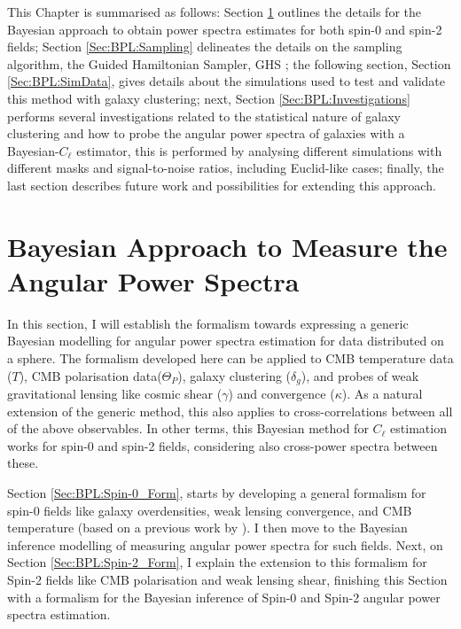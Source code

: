 \qquad This Chapter is summarised as follows: Section \ref{Sec:BPL:Modeling} outlines the details for the Bayesian approach to obtain power spectra estimates for both spin-0 and spin-2 fields; Section \ref{Sec:BPL:Sampling} delineates the details on the sampling algorithm, the Guided Hamiltonian Sampler, GHS \citep{SreeThesis,2013-GuidedHamiltonian}; the following section, Section \ref{Sec:BPL:SimData}, gives details about the simulations used to test and validate this method with galaxy clustering; next, Section \ref{Sec:BPL:Investigations} performs several investigations related to the statistical nature of galaxy clustering and how to probe the angular power spectra of galaxies with a Bayesian-$C_{\ell}$ estimator, this is performed by analysing different simulations with different masks and signal-to-noise ratios, including Euclid-like cases; finally, the last section describes future work and possibilities for extending this approach. 


\section{Bayesian Approach to Measure the Angular Power Spectra}\label{Sec:BPL:Modeling}
In this section, I will establish the formalism towards expressing a generic Bayesian modelling for angular power spectra estimation for data distributed on a sphere. The formalism developed here can be applied to CMB temperature data ($T$), CMB polarisation data($\Theta_P$), galaxy clustering ($\delta_g$), and probes of weak gravitational lensing like cosmic shear ($\gamma$) and convergence ($\kappa$). As a natural extension of the generic method, this also applies to cross-correlations between all of the above observables. In other terms, this Bayesian method for $C_{\ell}$ estimation works for spin-0 and spin-2 fields, considering also cross-power spectra between these.

\qquad Section \ref{Sec:BPL:Spin-0_Form}, starts by developing a general formalism for spin-0 fields like galaxy overdensities, weak lensing convergence, and CMB temperature (based on a previous work by \cite{Taylor2008}). I then move to the Bayesian inference modelling of measuring angular power spectra for such fields. Next, on Section \ref{Sec:BPL:Spin-2_Form}, I explain the extension to this formalism for Spin-2 fields like CMB polarisation and weak lensing shear, finishing this Section with a formalism for the Bayesian inference of Spin-0 and Spin-2 angular power spectra estimation.


